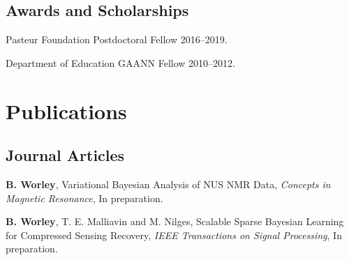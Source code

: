 \documentclass[letterpaper]{article}
\renewenvironment{itemize}{
  \begin{list}{}{
    \setlength{\leftmargin}{1.5em}
  }
}{
  \end{list}
}
\begin{document}
\subsection*{Awards and Scholarships}

\begin{itemize}
\item Pasteur Foundation Postdoctoral Fellow \hfill 2016--2019.
\item Department of Education GAANN Fellow \hfill 2010--2012.
\end{itemize}


\section*{Publications}

\subsection*{Journal Articles}




\begin{itemize}
\item \textbf{B. Worley},
 Variational Bayesian Analysis of NUS NMR Data,
 {\it Concepts in Magnetic Resonance}, In preparation.
\end{itemize}

\begin{itemize}
\item \textbf{B. Worley}, T. E. Malliavin and M. Nilges,
 Scalable Sparse Bayesian Learning for Compressed Sensing Recovery,
 {\it IEEE Transactions on Signal Processing}, In preparation.
\end{itemize}
\end{document}
